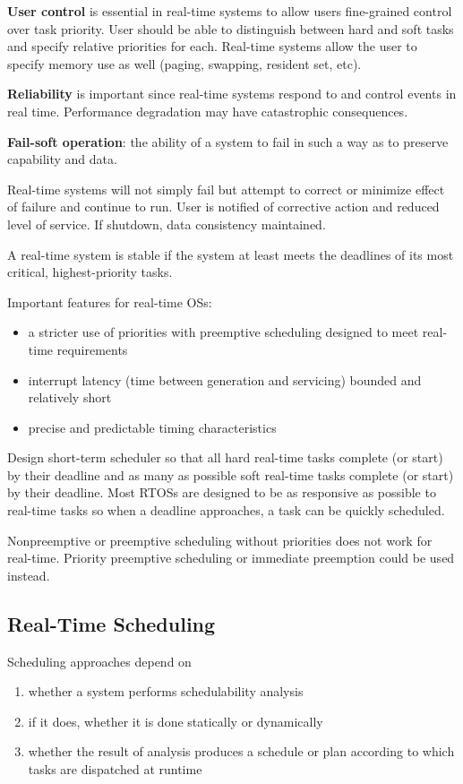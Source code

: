 \documentclass[11pt]{article}
\begin{document}
\textbf{User control} is essential in real-time systems to allow users fine-grained control over task priority.
User should be able to distinguish between hard and soft tasks and specify relative priorities for each.
Real-time systems allow the user to specify memory use as well (paging, swapping, resident set, etc).

\textbf{Reliability} is important since real-time systems respond to and control events in real time.
Performance degradation may have catastrophic consequences.

\textbf{Fail-soft operation}: the ability of a system to fail in such a way as to preserve capability and data.

Real-time systems will not simply fail but attempt to correct or minimize effect of failure and continue
to run.
User is notified of corrective action and reduced level of service. If shutdown, data consistency
maintained.

A real-time system is stable if the system at least meets the deadlines of its most critical, highest-priority tasks.

Important features for real-time OSs:
\begin{itemize}
\item a stricter use of priorities with preemptive scheduling designed to meet real-time requirements
\item interrupt latency (time between generation and servicing) bounded and relatively short
\item precise and predictable timing characteristics
\end{itemize}

Design short-term scheduler so that all hard real-time tasks complete (or start) by their deadline and as many as possible
soft real-time tasks complete (or start) by their deadline.
Most RTOSs are designed to be as responsive as possible to real-time tasks so when a deadline approaches, a task can be
quickly scheduled.

Nonpreemptive or preemptive scheduling without priorities does not work for real-time.
Priority preemptive scheduling or immediate preemption could be used instead.
\subsection{Real-Time Scheduling}
\label{sec:org267b3b5}
Scheduling approaches depend on
\begin{enumerate}
\item whether a system performs schedulability analysis
\item if it does, whether it is done statically or dynamically
\item whether the result of analysis produces a schedule or plan according to which tasks are dispatched at runtime
\end{enumerate}
\end{document}

